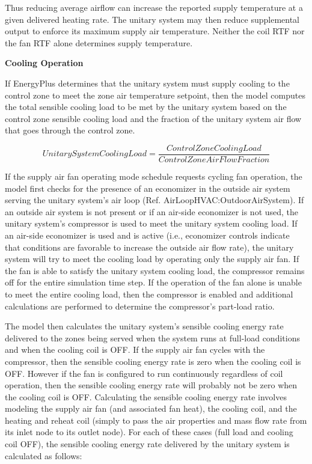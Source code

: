Thus reducing average airflow can increase the reported supply temperature at a given delivered heating rate. The unitary system may then reduce supplemental output to enforce its maximum supply air temperature. Neither the coil RTF nor the fan RTF alone determines supply temperature.

\textbf{Cooling Operation}

If EnergyPlus determines that the unitary system must supply cooling to the control zone to meet the zone air temperature setpoint, then the model computes the total sensible cooling load to be met by the unitary system based on the control zone sensible cooling load and the fraction of the unitary system air flow that goes through the control zone.

\begin{equation}
UnitarySystemCoolingLoad = \frac{{ControlZoneCoolingLoad}}{{ControlZoneAirFlowFraction}}
\label{eq:UnitarySystemCoolingLoad}
\end{equation}

If the supply air fan operating mode schedule requests cycling fan operation, the model first checks for the presence of an economizer in the outside air system serving the unitary system's air loop (Ref. AirLoopHVAC:OutdoorAirSystem). If an outside air system is not present or if an air-side economizer is not used, the unitary system's compressor is used to meet the unitary system cooling load. If an air-side economizer is used and is active (i.e., economizer controls indicate that conditions are favorable to increase the outside air flow rate), the unitary system will try to meet the cooling load by operating only the supply air fan. If the fan is able to satisfy the unitary system cooling load, the compressor remains off for the entire simulation time step. If the operation of the fan alone is unable to meet the entire cooling load, then the compressor is enabled and additional calculations are performed to determine the compressor's part-load ratio.

The model then calculates the unitary system's sensible cooling energy rate delivered to the zones being served when the system runs at full-load conditions and when the cooling coil is OFF. If the supply air fan cycles with the compressor, then the sensible cooling energy rate is zero when the cooling coil is OFF. However if the fan is configured to run continuously regardless of coil operation, then the sensible cooling energy rate will probably not be zero when the cooling coil is OFF. Calculating the sensible cooling energy rate involves modeling the supply air fan (and associated fan heat), the cooling coil, and the heating and reheat coil (simply to pass the air properties and mass flow rate from its inlet node to its outlet node). For each of these cases (full load and cooling coil OFF), the sensible cooling energy rate delivered by the unitary system is calculated as follows:

